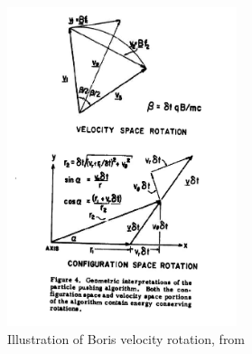 \begin{figure}[h]
  \centering
  \includegraphics[width=0.6\textwidth]{pics/chap1/boris.png}
  \caption[Illustration of Boris velocity rotation]{Illustration of Boris
    velocity rotation, from \citep{boris_relativistic_1970}}
  \label{fig:boris-velocity-rotation}
\end{figure}


